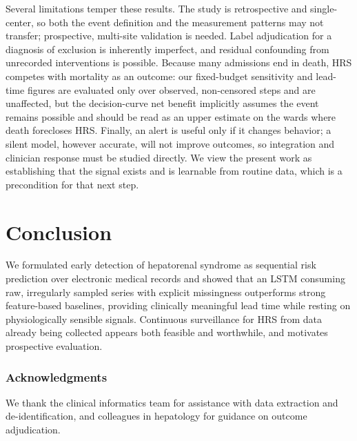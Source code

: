 \documentclass{article}
\begin{document}
Several limitations temper these results. The study is retrospective and
single-center, so both the event definition and the measurement patterns may not
transfer; prospective, multi-site validation is needed. Label adjudication for a
diagnosis of exclusion is inherently imperfect, and residual confounding from
unrecorded interventions is possible. Because many admissions end in death, HRS
competes with mortality as an outcome: our fixed-budget sensitivity and lead-time
figures are evaluated only over observed, non-censored steps and are unaffected, but
the decision-curve net benefit implicitly assumes the event remains possible and
should be read as an upper estimate on the wards where death forecloses HRS. Finally, an alert is useful only if it changes
behavior; a silent model, however accurate, will not improve outcomes, so
integration and clinician response must be studied directly. We view the present
work as establishing that the signal exists and is learnable from routine data,
which is a precondition for that next step.

\section{Conclusion}

We formulated early detection of hepatorenal syndrome as sequential risk prediction
over electronic medical records and showed that an LSTM consuming raw, irregularly
sampled series with explicit missingness outperforms strong feature-based baselines,
providing clinically meaningful lead time while resting on physiologically sensible
signals. Continuous surveillance for HRS from data already being collected appears
both feasible and worthwhile, and motivates prospective evaluation.

\subsubsection*{Acknowledgments}

We thank the clinical informatics team for assistance with data extraction and
de-identification, and colleagues in hepatology for guidance on outcome
adjudication.
\end{document}
